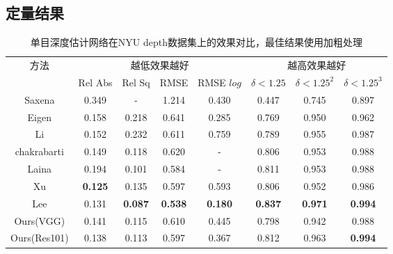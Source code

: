 \subsection{定量结果}
\begin{table}[htb]
    \centering
    \caption{单目深度估计网络在NYU depth数据集上的效果对比，最佳结果使用加粗处理}
    \label{tab:nyu cls quantitative result}
    \begin{tabular}{c|cccc|ccc}
      \toprule
      \multirow{2}{*}{方法} & \multicolumn{4}{c}{越低效果越好}&\multicolumn{3}{|c}{越高效果越好}\\
      & Rel Abs & Rel Sq & RMSE& RMSE $log$ &$\delta<1.25$ &$\delta<1.25^2$ & $\delta<1.25^3$ \\   
      \midrule            
      Saxena\cite{Make3D}&0.349&-&1.214&0.430&0.447&0.745&0.897\\
      Eigen\cite{eigen2014depth}&0.158&0.218&0.641&0.285&0.769&0.950&0.962\\
      Li\cite{li2015depth}&0.152&0.232&0.611&0.759&0.789&0.955&0.987\\
      chakrabarti\cite{chakrabarti2016depth}&0.149&0.118&0.620&-&0.806&0.953&0.988\\
      Laina\cite{laina2016deeper}&0.194&0.101&0.584&-&0.811&0.953&0.988\\
      Xu\cite{xu2018structured}&\textbf{0.125}&0.135&0.597&0.593&0.806&0.952&0.986\\
      Lee\cite{lee2019monocular}&0.131&\textbf{0.087}&\textbf{0.538}&\textbf{0.180}&\textbf{0.837}&\textbf{0.971}&\textbf{0.994}\\
      Ours(VGG)&0.141&0.115&0.610&0.445&0.798&0.942&0.988\\
      Ours(Res101)&0.138&0.113&0.597&0.367&0.812&0.963&\textbf{0.994}\\
      \bottomrule
    \end{tabular}
  \end{table}
